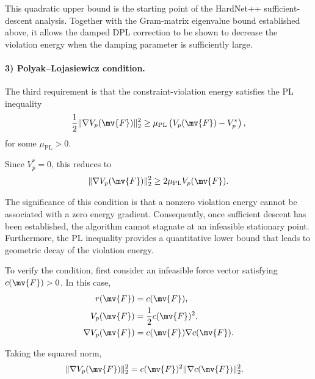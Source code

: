 This quadratic upper bound is the starting point of the HardNet++
sufficient-descent analysis. Together with the Gram-matrix eigenvalue bound
established above, it allows the damped DPL correction to be shown to decrease
the violation energy when the damping parameter is sufficiently large.

\paragraph{3) Polyak--Lojasiewicz condition.}

The third requirement is that the constraint-violation energy satisfies the PL
inequality
\begin{equation}
	\label{Tire:eq:pl:general}
	\frac{1}{2}
	\|\nabla V_p(\mv{F})\|_2^2
	\geq
	\mu_{\mathrm{PL}}
	\left(
	V_p(\mv{F})-V_p^*
	\right)
	,
\end{equation}
for some $\mu_{\mathrm{PL}}>0$.

Since $V_p^*=0$, this reduces to
\begin{equation}
	\|\nabla V_p(\mv{F})\|_2^2
	\geq
	2\mu_{\mathrm{PL}}V_p(\mv{F})
	.
\end{equation}

The significance of this condition is that a nonzero violation energy cannot be
associated with a zero energy gradient. Consequently, once sufficient descent
has been established, the algorithm cannot stagnate at an infeasible stationary
point. Furthermore, the PL inequality provides a quantitative lower bound that
leads to geometric decay of the violation energy.

To verify the condition, first consider an infeasible force vector satisfying
$c(\mv{F})>0$. In this case,
\begin{equation}
	\begin{aligned}
		r(\mv{F})
		 & =
		c(\mv{F})
		,
		\\
		V_p(\mv{F})
		 & =
		\frac{1}{2}c(\mv{F})^2
		,
		\\
		\nabla V_p(\mv{F})
		 & =
		c(\mv{F})\nabla c(\mv{F})
		.
	\end{aligned}
\end{equation}

Taking the squared norm,
\begin{equation}
	\begin{aligned}
		\|\nabla V_p(\mv{F})\|_2^2
		 & =
		c(\mv{F})^2
		\|\nabla c(\mv{F})\|_2^2
		.
	\end{aligned}
\end{equation}

